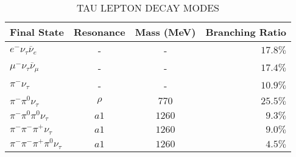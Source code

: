 \begin{table}[htpb]
  \begin{center}
    \caption{TAU LEPTON DECAY MODES}
    \label{tab:taudecays}
    \begin{tabular}{lccr}
      \toprule
      Final State & Resonance & Mass (MeV) & Branching Ratio \\
      \midrule
      $e^{-}\nu_{\tau}\overline{\nu}_{e}$      & -      & -      & $17.8\%$ \\
      $\mu^{-}\nu_{\tau}\overline{\nu}_{\mu}$  & -      & -      & $17.4\%$ \\
      $\pi^{-}\nu_{\tau}$                      & -      & -      & $10.9\%$ \\
      $\pi^{-}\pi^{0}\nu_{\tau}$               & $\rho$ & $770$  & $25.5\%$ \\
      $\pi^{-}\pi^{0}\pi^{0}\nu_{\tau}$        & $a1$   & $1260$ & $9.3\%$  \\
      $\pi^{-}\pi^{-}\pi^{+}\nu_{\tau}$        & $a1$   & $1260$ & $9.0\%$  \\
      $\pi^{-}\pi^{-}\pi^{+}\pi^{0}\nu_{\tau}$ & $a1$   & $1260$ & $4.5\%$  \\
      \bottomrule
    \end{tabular}
  \end{center}
\end{table}

